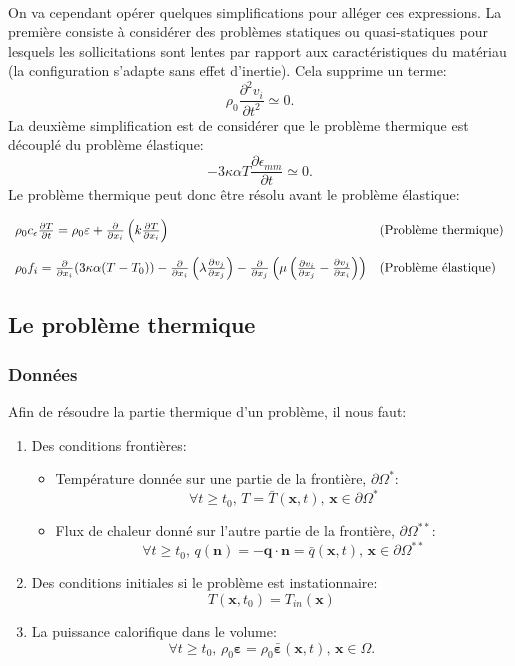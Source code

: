 \paragraph{}
On va cependant opérer quelques simplifications pour alléger ces expressions. La première consiste à considérer des problèmes statiques ou quasi-statiques pour lesquels les sollicitations sont lentes par rapport aux caractéristiques du matériau (la configuration s'adapte sans effet d'inertie). Cela supprime un terme:
$$\rho_0\frac{\partial^2v_i}{\partial t^2}\simeq 0.$$
La deuxième simplification est de considérer que le problème thermique est découplé du problème élastique:
$$-3\kappa\alpha T\frac{\partial \epsilon_{mm}}{\partial t}\simeq 0.$$ Le problème thermique peut donc être résolu avant le problème élastique:

$$\begin{array}{ll}
\rho_0c_\epsilon\frac{\partial T}{\partial t}=\rho_0\varepsilon+\frac{\partial}{\partial x_i}\left(k\frac{\partial T}{\partial x_i}\right)&\text{(Problème thermique)}\vspace{0.4cm}\\
\rho_0f_i=\frac{\partial}{\partial x_i}(3\kappa\alpha(T-T_0))-\frac{\partial}{\partial x_i}\left(\lambda\frac{\partial v_j}{\partial x_j}\right)-\frac{\partial}{\partial x_j}\left(\mu\left(\frac{\partial v_i}{\partial x_j}-\frac{\partial v_j}{\partial x_i}\right)\right) &\text{(Problème élastique)}
\end{array}$$

\subsection{Le problème thermique}
\subsubsection*{Données}
Afin de résoudre la partie thermique d'un problème, il nous faut:
\begin{enumerate}
\item Des conditions frontières:
	\begin{itemize}
	\item Température donnée sur une partie de la frontière, $\partial\Omega^*$: 
	  $$\forall t\geq t_0,\, T=\bar{T}(\textbf{x},t),\, \textbf{x}\in\partial\Omega^*$$
	\item Flux de chaleur donné sur l'autre partie de la frontière, $\partial\Omega^{**}$:
	 $$\forall t\geq t_0,\, q(\textbf{n})=-\textbf{q}\cdot\textbf{n}=\bar{q}(\textbf{x},t),\, \textbf{x}\in\partial\Omega^{**}$$
	\end{itemize}
\item Des conditions initiales si le problème est instationnaire: $$T(\textbf{x},t_0)=T_{in}(\textbf{x})$$
\item La puissance calorifique dans le volume: 
$$\forall t\geq t_0,\,\rho_0\boldsymbol{\varepsilon}=\rho_0\bar{\boldsymbol{\varepsilon}}(\textbf{x},t),\, \textbf{x}\in \Omega.$$
\end{enumerate}
